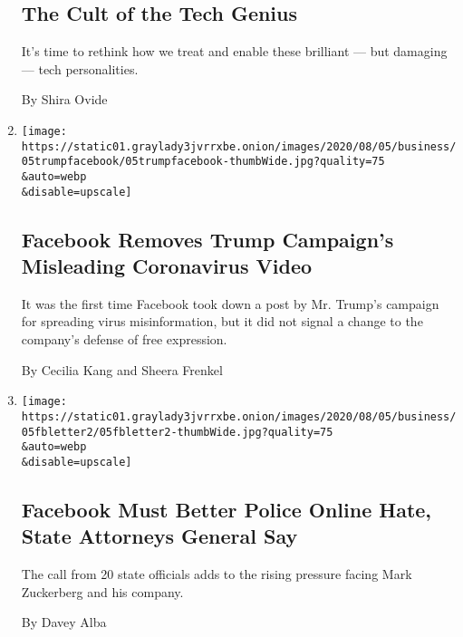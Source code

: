 \begin{enumerate}
  \hypertarget{the-cult-of-the-tech-genius}{%
  \subsection{The Cult of the Tech
  Genius}\label{the-cult-of-the-tech-genius}}

  It's time to rethink how we treat and enable these brilliant --- but
  damaging --- tech personalities.

  By Shira Ovide
\item
  \href{/2020/08/05/technology/trump-facebook-coronavirus-video.html}{}

  \texttt{[image: https://static01.graylady3jvrrxbe.onion/images/2020/08/05/business/05trumpfacebook/05trumpfacebook-thumbWide.jpg?quality=75\\\&auto=webp\\\&disable=upscale]}

  \hypertarget{facebook-removes-trump-campaigns-misleading-coronavirus-video}{%
  \subsection{Facebook Removes Trump Campaign's Misleading Coronavirus
  Video}\label{facebook-removes-trump-campaigns-misleading-coronavirus-video}}

  It was the first time Facebook took down a post by Mr. Trump's
  campaign for spreading virus misinformation, but it did not signal a
  change to the company's defense of free expression.

  By Cecilia Kang and Sheera Frenkel
\item
  \href{/2020/08/05/technology/facebook-online-hate.html}{}

  \texttt{[image: https://static01.graylady3jvrrxbe.onion/images/2020/08/05/business/05fbletter2/05fbletter2-thumbWide.jpg?quality=75\\\&auto=webp\\\&disable=upscale]}

  \hypertarget{facebook-must-better-police-online-hate-state-attorneys-general-say}{%
  \subsection{Facebook Must Better Police Online Hate, State Attorneys
  General
  Say}\label{facebook-must-better-police-online-hate-state-attorneys-general-say}}

  The call from 20 state officials adds to the rising pressure facing
  Mark Zuckerberg and his company.

  By Davey Alba
\end{enumerate}

